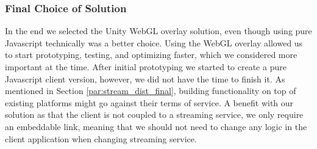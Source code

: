 \subsubsection{Final Choice of Solution}
\label{par:client_final}
In the end we selected the Unity WebGL overlay solution, even though using pure Javascript technically was a better choice. Using the WebGL overlay allowed us to start prototyping, testing, and optimizing faster, which we considered more important at the time. After initial prototyping we started to create a pure Javascript client version, however, we did not have the time to finish it. 
As mentioned in Section \ref{par:stream_dist_final}, building functionality on top of existing platforms might go against their terms of service. A benefit with our solution as that the client is not coupled to a streaming service, we only require an embeddable link, meaning that we should not need to change any logic in the client application when changing streaming service.
